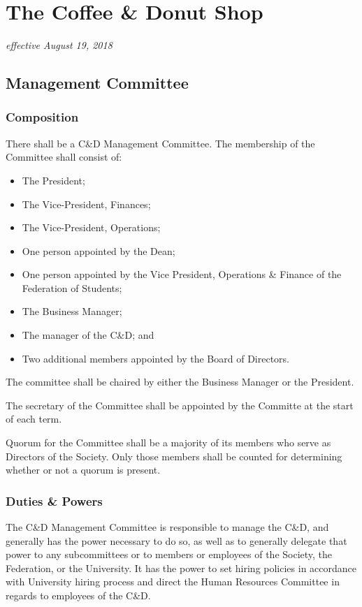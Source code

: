 \section{The Coffee \& Donut Shop}
\emph{effective August 19, 2018}\\

\subsection{Management Committee}
\subsubsection{Composition}
There shall be a C\&D Management Committee. The membership of the Committee shall
consist of:
\begin{itemize}
    \item The President;
    \item The Vice-President, Finances;
    \item The Vice-President, Operations;
    \item One person appointed by the Dean;
    \item One person appointed by the Vice President, Operations \& Finance of
        the Federation of Students; 
    \item The Business Manager;
    \item The manager of the C\&D; and
    \item Two additional members appointed by the Board of Directors.
\end{itemize}

The committee shall be chaired by either the Business Manager or the President.

The secretary of the Committee shall be appointed by the Committe at the start
of each term.

Quorum for the Committee shall be a majority of its members who serve as
Directors of the Society. Only those members shall be counted for determining
whether or not a quorum is present.

\subsubsection{Duties \& Powers}
The C\&D Management Committee is responsible to manage the C\&D, and generally
has the power necessary to do so, as well as to generally delegate that power
to any subcommittees or to members or employees of the Society, the Federation,
or the University. It has the power to set hiring policies in accordance with
University hiring process and direct the Human Resources Committee in regards
to employees of the C\&D.


